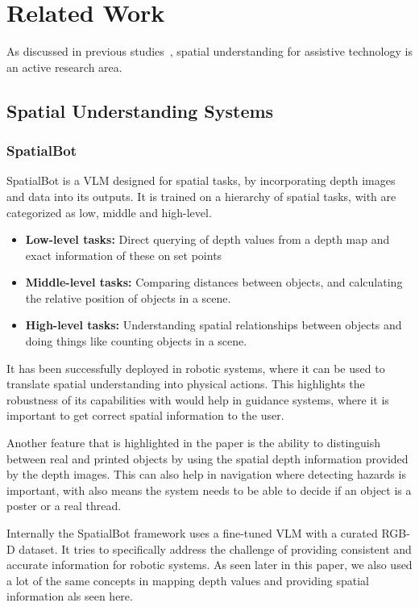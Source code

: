 \section{Related Work}

As discussed in previous studies~\cite{googleFinetuning2025}, spatial understanding for assistive technology is an active research area.

\subsection{Spatial Understanding Systems}

\subsubsection{SpatialBot}
SpatialBot is a VLM designed for spatial tasks, by incorporating depth images and data into its outputs.
It is trained on a hierarchy of spatial tasks, with are categorized as low, middle and high-level.
\begin{itemize}
    \item \textbf{Low-level tasks:} Direct querying of depth values from a depth map and exact information of these on set points
    \item \textbf{Middle-level tasks:} Comparing distances between objects, and calculating the relative position of objects in a scene.
    \item \textbf{High-level tasks:} Understanding spatial relationships between objects and doing things like counting objects in a scene.
\end{itemize}

It has been successfully deployed in robotic systems, where it can be used to translate spatial understanding into physical actions.
This highlights the robustness of its capabilities with would help in guidance systems, where it is important to get correct spatial information to the user.

Another feature that is highlighted in the paper is the ability to distinguish between real and printed objects by using the spatial depth information provided by the depth images.
This can also help in navigation where detecting hazards is important, with also means the system needs to be able to decide if an object is a poster or a real thread.

Internally the SpatialBot framework uses a fine-tuned VLM with a curated RGB-D dataset.
It tries to specifically address the challenge of providing consistent and accurate information for robotic systems.
As seen later in this paper, we also used a lot of the same concepts in mapping depth values and providing spatial information als seen here.\cite{SpatialBotCai2025}

